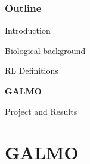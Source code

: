 \documentclass[ignorenonframetext]{beamer}
\begin{document}
\begin{frame}
\frametitle{Outline}
\begin{enumerate}\large{
		\item Introduction \checkmark\vspace*{.4cm}
		\item Biological background \checkmark\vspace*{.4cm}
		\item RL Definitions \checkmark\vspace*{.4cm}
		\item \textbf{GALMO}\vspace*{.4cm}
		\item Project and Results}
\end{enumerate}
\end{frame}

\section*{GALMO}
\end{document}
